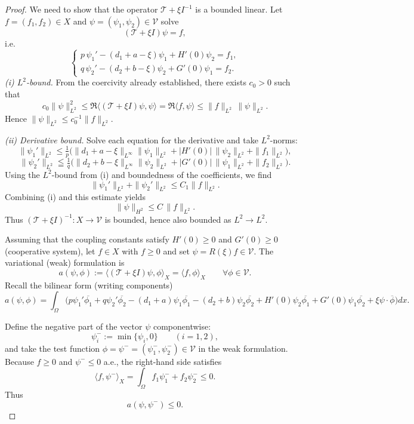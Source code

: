 \documentclass[a4paper,11pt]{amsart}
\theoremstyle{definition}
\numberwithin{equation}{section}
\theoremstyle{definition}
\begin{document}
\begin{proof}
We need to show that the operator $\mathscr T + \xi I ^{-1}$ is a bounded linear. Let $f=(f_1,f_2)\in X$ and $\psi=(\psi_1,\psi_2)\in\mathcal V$ solve
\[
(\mathscr T+\xi I)\psi=f,
\]
i.e.
\[
\begin{cases}
p\,\psi_1' - (d_1+a-\xi)\psi_1 + H'(0)\psi_2 = f_1,\\
q\,\psi_2' - (d_2+b-\xi)\psi_2 + G'(0)\psi_1 = f_2.
\end{cases}
\]
\emph{(i) $L^2$-bound.} From the coercivity already established, there exists $c_0>0$ such that
\[
c_0\|\psi\|_{L^2}^2 \leq \Re\langle(\mathscr T+\xi I)\psi,\psi\rangle
= \Re\langle f,\psi\rangle \leq \|f\|_{L^2}\,\|\psi\|_{L^2}.
\]
Hence $\|\psi\|_{L^2}\leq c_0^{-1}\|f\|_{L^2}$.

\emph{(ii) Derivative bound.}
Solve each equation for the derivative and take $L^2$-norms:
\[
\|\psi_1'\|_{L^2}
\leq \tfrac{1}{p}\Big(\|d_1+a-\xi\|_{L^\infty}\|\psi_1\|_{L^2} + |H'(0)|\,\|\psi_2\|_{L^2} + \|f_1\|_{L^2}\Big),
\]
\[
\|\psi_2'\|_{L^2}
\leqq \tfrac{1}{q}\Big(\|d_2+b-\xi\|_{L^\infty}\|\psi_2\|_{L^2} + |G'(0)|\,\|\psi_1\|_{L^2} + \|f_2\|_{L^2}\Big).
\]
Using the $L^2$-bound from (i) and boundedness of the coefficients, we find
\[
\|\psi_1'\|_{L^2}+\|\psi_2'\|_{L^2}\leq C_1\|f\|_{L^2}.
\]
Combining (i) and this estimate yields
\[
\|\psi\|_{H^2} \le C\,\|f\|_{L^2}.
\]
Thus $(\mathscr T+\xi I)^{-1}:X\to\mathcal V$ is bounded, hence also bounded as $L^2\to L^2$.



Assuming that  the coupling constants satisfy $H'(0)\geq 0$ and $G'(0)\geq 0$ (cooperative system), let $f\in X$ with $f\ge0$ and set $\psi=R(\xi)f\in\mathcal V$. The variational (weak) formulation is
\[
a(\psi,\phi) := \langle(\mathscr T+\xi I)\psi,\phi\rangle_{X} = \langle f,\phi\rangle_X
\qquad\forall \phi\in\mathcal V.
\]
Recall the bilinear form (writing components)
\[
a(\psi,\phi)=\int_{\Omega}\Big( p\psi_1'\overline{\phi_1} + q\psi_2'\overline{\phi_2}
- (d_1+a)\psi_1\overline{\phi_1} - (d_2+b)\psi_2\overline{\phi_2}
+ H'(0)\psi_2\overline{\phi_1} + G'(0)\psi_1\overline{\phi_2} + \xi\psi\cdot\overline\phi \Big) dx.
\]

Define the negative part of the vector $\psi$ componentwise:
\[
\psi_i^- := \min\{\psi_i,0\}\qquad (i=1,2),
\]
and take the test function $\phi=\psi^-=(\psi_1^-,\psi_2^-)\in\mathcal V$ in the weak formulation. Because $f\geq0$ and $\psi^- \le 0$ a.e., the right-hand side satisfies
\[
\langle f,\psi^-\rangle_X = \int_\Omega f_1\psi_1^- + f_2\psi_2^- \le 0.
\]
Thus
\[
a(\psi,\psi^-) \le 0. \tag{1}
\]


\end{proof}
\end{document}
